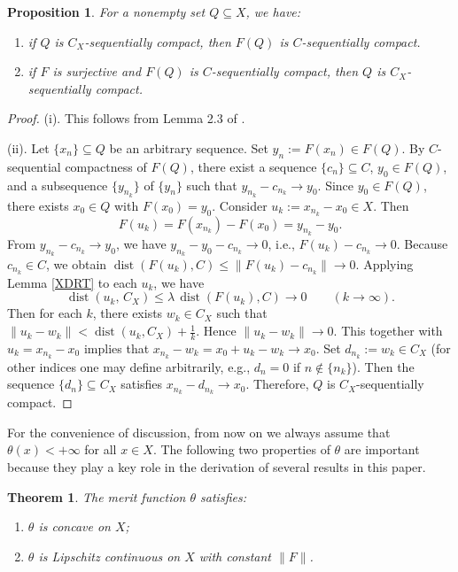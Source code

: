\documentclass[11pt]{article}
\DeclareMathOperator{\dist}{dist}
\newtheorem{theorem}{Theorem}[section]
\newtheorem{proposition}{Proposition}[section]
\begin{document}
\begin{proposition}
	For a nonempty set $Q \subseteq X$, we have:
	\begin{enumerate}
		\item[(i)] if $Q$ is $C_X$-sequentially compact, then $F(Q)$ is $C$-sequentially compact.
		\item[(ii)] if $F$ is surjective     and    $F(Q)$ is $C$-sequentially compact, then   $Q$ is $C_X$-sequentially compact.
	\end{enumerate}
\end{proposition}

\begin{proof}
	(i). This follows from Lemma 2.3 of   \cite{Han2026}.
	
	(ii). Let $\{x_n\} \subseteq Q$ be an arbitrary sequence. Set $y_n:=F(x_n)\in F(Q)$. By $C$-sequential compactness of $F(Q)$, there exist a sequence $\{c_n\}  \subseteq C$, $y_0\in F(Q)$, and a subsequence $\{y_{n_k}\} $ of  $\{y_n\}$ such that
$	y_{n_k}-c_{n_k}\to y_0  $.
	Since $y_0\in F(Q)$, there exists $x_0\in Q$ with $F(x_0)=y_0$. Consider $u_k:=x_{n_k}-x_0\in X$. Then
	\[
	F(u_k)=F(x_{n_k})-F(x_0)=y_{n_k}-y_0.
	\]
	From $y_{n_k}-c_{n_k}\to y_0$, we have $y_{n_k}-y_0-c_{n_k}\to0$, i.e.,
$	F(u_k)-c_{n_k}\to 0 .$
	Because $c_{n_k}\in C$, we obtain $\dist(F(u_k),C)\le \|F(u_k)-c_{n_k}\|\to0$.
	Applying Lemma \ref{XDRT} to each $u_k$, we  have 
	\[
	\dist(u_k,\,C_X)\le \lambda \,\dist(F(u_k),C) \to 0 \qquad(k\to\infty).
	\]
Then for each $k$, there exists $w_k\in C_X$ such that $\|u_k-w_k\|<\dist(u_k,C_X)+\frac1k$. Hence $\|u_k-w_k\|\to0$.
	This together with  $u_k=x_{n_k}-x_0$  implies that 
	$	x_{n_k}-w_k = x_0 + u_k - w_k \to x_0 .$
	Set $d_{n_k}:=w_k\in C_X$ (for other indices one may define arbitrarily, e.g., $d_n=0$ if $n\notin\{n_k\}$). Then the sequence $\{d_n\}\subseteq C_X$ satisfies $x_{n_k}-d_{n_k}\to x_0$. Therefore,  $Q$ is $C_X$-sequentially compact.
\end{proof}

For the convenience of discussion, from now on we always assume that $\theta(x)<+\infty$ for all $x\in X$. The following two properties of $\theta$ are important because they play a key role in the derivation of several results in this paper.

\begin{theorem}\label{YL:thetaprop2}
	The  merit function $\theta$ satisfies:
	\begin{enumerate}
		\item[(i)] $\theta$ is concave on $X$;
		\item[(ii)] $\theta$ is Lipschitz continuous on $X$ with constant $\|F\|$.
	\end{enumerate}
\end{theorem}
\end{document}
